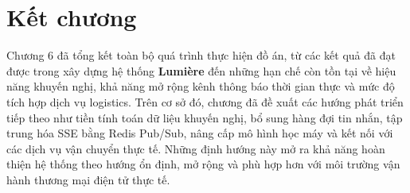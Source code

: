 \documentclass[../DoAn.tex]{subfiles}
\begin{document}
\section*{Kết chương}
Chương 6 đã tổng kết toàn bộ quá trình thực hiện đồ án, từ các kết quả đã đạt được trong xây dựng hệ thống \textbf{Lumière} đến những hạn chế còn tồn tại về hiệu năng khuyến nghị, khả năng mở rộng kênh thông báo thời gian thực và mức độ tích hợp dịch vụ logistics. Trên cơ sở đó, chương đã đề xuất các hướng phát triển tiếp theo như tiền tính toán dữ liệu khuyến nghị, bổ sung hàng đợi tin nhắn, tập trung hóa SSE bằng Redis Pub/Sub, nâng cấp mô hình học máy và kết nối với các dịch vụ vận chuyển thực tế. Những định hướng này mở ra khả năng hoàn thiện hệ thống theo hướng ổn định, mở rộng và phù hợp hơn với môi trường vận hành thương mại điện tử thực tế.
\end{document}
